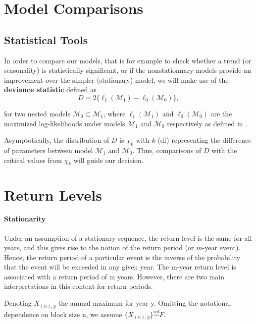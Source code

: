 \documentclass[11pt,a4paper,openany ]{book}
\begin{document}
\section{Model Comparisons}

\subsection{Statistical Tools}

In order to compare our models, that is for example to check whether a trend (or seasonality) is statistically significant, or if the nonstationnary models provide an improvement over the simpler (stationary) model, we will make use of the \textbf{deviance statistic} defined as 
\begin{equation}
D = 2\big\{\ell_1(\mathcal{M}_1)-\ell_0(\mathcal{M}_0)\big\},
\end{equation}

for two nested models $\mathcal{M}_0\subset \mathcal{M}_1$, where $\ell_1(\mathcal{M}_1)$ and $\ell_0(\mathcal{M}_0)$ are the maximized log-likelihoods under models $\mathcal{M}_1$ and $\mathcal{M}_0$ respectively as defined in .

Asymptotically, the distribution of $D$ is $\chi_k$ with $k$ (df) representing the difference of parameters between model $\mathcal{M}_1$ and $\mathcal{M}_0$. Thus, comparisons of $D$ with the critical values from $\chi_k$ will guide our decision.


\section{Return Levels}


\paragraph*{ Stationarity} Under an assumption of a
stationary sequence, the return level is the same for all years, and this gives rise to the notion
of the return period (or $m$-year event). Hence, the return period of a particular event is the
inverse of the probability that the event will be exceeded in any given year. The m-year return level is associated with a return period of m years. However, there are two main interpretations in this context for return periods.

\cite[pp.100]{aghakouchak_extremes_2013-1}

Denoting $X_{(n),y}$ the annual maximum for year y. Omitting the notational dependence on block size n, we assume $\{X_{(n),y}\}\stackrel{iid}{\sim}F$. 
\end{document}
